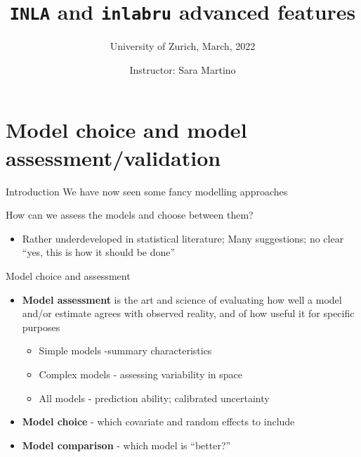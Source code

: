 \documentclass[
  ignorenonframetext,
  handout]{beamer}
\title{\texttt{INLA} and \texttt{inlabru} advanced features}
\subtitle{University of Zurich, March, 2022}
\author{Instructor: Sara Martino}
\date{}
\institute{Department of Mathematical Science (NTNU)}
\providecommand{\tightlist}{%
  \setlength{\itemsep}{0pt}\setlength{\parskip}{0pt}}
\begin{document}
\frame{\titlepage}

\begin{frame}[allowframebreaks]
  \tableofcontents[hideallsubsections]
\end{frame}
\begin{frame}
\end{frame}

\hypertarget{model-choice-and-model-assessmentvalidation}{%
\section{Model choice and model
assessment/validation}\label{model-choice-and-model-assessmentvalidation}}

\begin{frame}{Introduction}
\protect\hypertarget{introduction}{}
We have now seen some fancy modelling approaches

How can we assess the models and choose between them?

\pause

\begin{itemize}
\tightlist
\item
  Rather underdeveloped in statistical literature; Many suggestions; no
  clear ``yes, this is how it should be done''
\end{itemize}
\end{frame}

\begin{frame}{Model choice and assessment}
\protect\hypertarget{model-choice-and-assessment}{}
\begin{itemize}
\item
  \textbf{Model assessment} is the art and science of evaluating how
  well a model and/or estimate agrees with observed reality, and of how
  useful it for specific purposes

  \begin{itemize}
  \tightlist
  \item
    Simple models -summary characteristics
  \item
    Complex models - assessing variability in space
  \item
    All models - prediction ability; calibrated uncertainty
  \end{itemize}
\item
  \textbf{Model choice} - which covariate and random effects to include
\item
  \textbf{Model comparison} - which model is ``better?''
\end{itemize}
\end{frame}
\end{document}

